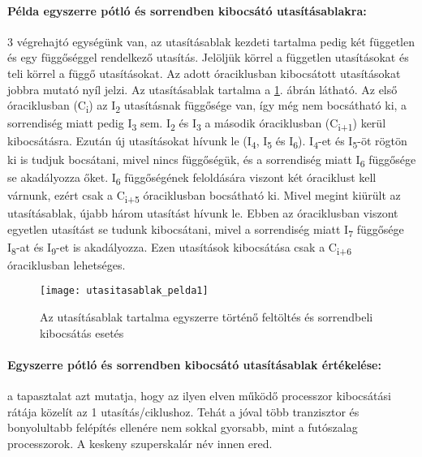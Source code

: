 \paragraph{Példa egyszerre pótló és sorrendben kibocsátó utasításablakra:} 3 végrehajtó egységünk van, az utasításablak kezdeti tartalma pedig két független és egy függőséggel rendelkező utasítás.
Jelöljük körrel a független utasításokat és teli körrel a függő utasításokat. Az adott óraciklusban kibocsátott utasításokat jobbra mutató nyíl jelzi.
Az utasításablak tartalma a \ref{fig:utasitasablak_pelda1}. ábrán látható.
Az első óraciklusban (C\textsubscript{i}) az I\textsubscript{2} utasításnak függősége van, így még nem bocsátható ki, a sorrendiség miatt pedig I\textsubscript{3} sem.
I\textsubscript{2} és I\textsubscript{3} a második óraciklusban (C\textsubscript{i+1}) kerül kibocsátásra.
Ezután új utasításokat hívunk le (I\textsubscript{4}, I\textsubscript{5} és I\textsubscript{6}).
I\textsubscript{4}-et és I\textsubscript{5}-öt rögtön ki is tudjuk bocsátani, mivel nincs függőségük, és a sorrendiség miatt I\textsubscript{6} függősége se akadályozza őket.
I\textsubscript{6} függőségének feloldására viszont két óraciklust kell várnunk, ezért csak a C\textsubscript{i+5} óraciklusban bocsátható ki.
Mivel megint kiürült az utasításablak, újabb három utasítást hívunk le.
Ebben az óraciklusban viszont egyetlen utasítást se tudunk kibocsátani, mivel a sorrendiség miatt I\textsubscript{7} függősége I\textsubscript{8}-at és I\textsubscript{9}-et is akadályozza.
Ezen utasítások kibocsátása csak a C\textsubscript{i+6} óraciklusban lehetséges.
\begin{figure}[h]
    \texttt{[image: utasitasablak\_pelda1]}
    \centering
    \caption{Az utasításablak tartalma egyszerre történő feltöltés és sorrendbeli kibocsátás esetés}
    \label{fig:utasitasablak_pelda1}
\end{figure}
\paragraph{Egyszerre pótló és sorrendben kibocsátó utasításablak értékelése:} a tapasztalat azt mutatja, hogy az ilyen elven működő processzor kibocsátási rátája közelít az 1 utasítás/ciklushoz.
Tehát a jóval több tranzisztor és bonyolultabb felépítés ellenére nem sokkal gyorsabb, mint a futószalag processzorok.
A keskeny szuperskalár név innen ered.

